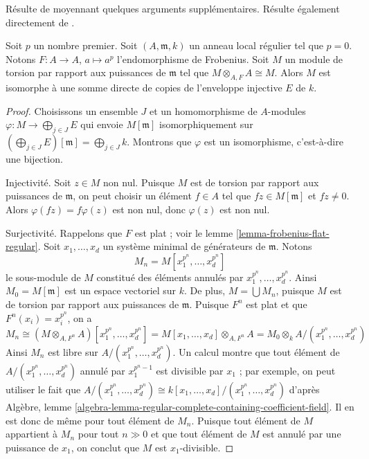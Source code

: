 \begin{lemma}
\label{lemma-structure-torsion-Frobenius-regular}
\begin{reference}
Résulte de \cite[Corollary 3.6]{Huneke-Sharp} moyennant quelques arguments supplémentaires. Résulte également directement de \cite[Theorem 1.4]{Lyubeznik2}.
\end{reference}
Soit $p$ un nombre premier. Soit $(A, \mathfrak m, k)$ un anneau local régulier tel que $p = 0$. Notons $F : A \to A$, $a \mapsto a^p$ l'endomorphisme de Frobenius. Soit $M$ un module de torsion par rapport aux puissances de $\mathfrak m$ tel que $M \otimes_{A, F} A \cong M$. Alors $M$ est isomorphe à une somme directe de copies de l'enveloppe injective $E$ de $k$.
\end{lemma}

\begin{proof}
Choisissons un ensemble $J$ et un homomorphisme de $A$-modules $\varphi : M \to \bigoplus_{j \in J} E$ qui envoie $M[\mathfrak m]$ isomorphiquement sur $(\bigoplus_{j \in J} E)[\mathfrak m] = \bigoplus_{j \in J} k$. Montrons que $\varphi$ est un isomorphisme, c'est-à-dire une bijection.

\medskip\noindent
Injectivité. Soit $z \in M$ non nul. Puisque $M$ est de torsion par rapport aux puissances de $\mathfrak m$, on peut choisir un élément $f \in A$ tel que $fz \in M[\mathfrak m]$ et $fz \not = 0$. Alors $\varphi(fz) = f\varphi(z)$ est non nul, donc $\varphi(z)$ est non nul.

\medskip\noindent
Surjectivité. Rappelons que $F$ est plat ; voir le lemme \ref{lemma-frobenius-flat-regular}. Soit $x_1, \ldots, x_d$ un système minimal de générateurs de $\mathfrak m$. Notons
$$
M_n = M[x_1^{p^n}, \ldots, x_d^{p^n}]
$$
le sous-module de $M$ constitué des éléments annulés par $x_1^{p^n}, \ldots, x_d^{p^n}$. Ainsi $M_0 = M[\mathfrak m]$ est un espace vectoriel sur $k$. De plus, $M = \bigcup M_n$, puisque $M$ est de torsion par rapport aux puissances de $\mathfrak m$. Puisque $F^n$ est plat et que $F^n(x_i) = x_i^{p^n}$, on a
$$
M_n \cong (M \otimes_{A, F^n} A)[x_1^{p^n}, \ldots, x_d^{p^n}] =
M[x_1, \ldots, x_d] \otimes_{A, F^n} A =
M_0 \otimes_k A/(x_1^{p^n}, \ldots, x_d^{p^n})
$$
Ainsi $M_n$ est libre sur $A/(x_1^{p^n}, \ldots, x_d^{p^n})$. Un calcul montre que tout élément de $A/(x_1^{p^n}, \ldots, x_d^{p^n})$ annulé par $x_1^{p^n - 1}$ est divisible par $x_1$ ; par exemple, on peut utiliser le fait que $A/(x_1^{p^n}, \ldots, x_d^{p^n}) \cong
k[x_1, \ldots, x_d]/(x_1^{p^n}, \ldots, x_d^{p^n})$ d'après Algèbre, lemme \ref{algebra-lemma-regular-complete-containing-coefficient-field}. Il en est donc de même pour tout élément de $M_n$. Puisque tout élément de $M$ appartient à $M_n$ pour tout $n \gg 0$ et que tout élément de $M$ est annulé par une puissance de $x_1$, on conclut que $M$ est $x_1$-divisible.


\end{proof}
